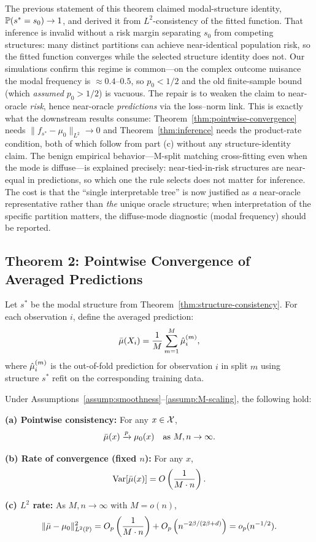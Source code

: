 \documentclass[12pt]{article}
\newcommand{\convp}{\xrightarrow{p}}
\begin{document}
\begin{remark}
The previous statement of this theorem claimed modal-structure identity, $\mathbb{P}(s^* = s_0)\to 1$, and derived it from $L^2$-consistency of the fitted function. That inference is invalid without a risk margin separating $s_0$ from competing structures: many distinct partitions can achieve near-identical population risk, so the fitted function converges while the selected structure identity does not. Our simulations confirm this regime is common---on the complex outcome nuisance the modal frequency is $\approx 0.4$--$0.5$, so $p_0 < 1/2$ and the old finite-sample bound (which \emph{assumed} $p_0 > 1/2$) is vacuous. The repair is to weaken the claim to near-oracle \emph{risk}, hence near-oracle \emph{predictions} via the loss--norm link. This is exactly what the downstream results consume: Theorem~\ref{thm:pointwise-convergence} needs $\|f_{s^*}-\mu_0\|_{L^2}\to 0$ and Theorem~\ref{thm:inference} needs the product-rate condition, both of which follow from part (c) without any structure-identity claim. The benign empirical behavior---M-split matching cross-fitting even when the mode is diffuse---is explained precisely: near-tied-in-risk structures are near-equal in predictions, so which one the rule selects does not matter for inference. The cost is that the ``single interpretable tree'' is now justified as \emph{a} near-oracle representative rather than \emph{the} unique oracle structure; when interpretation of the specific partition matters, the diffuse-mode diagnostic (modal frequency) should be reported.
\end{remark}

\subsection{Theorem 2: Pointwise Convergence of Averaged Predictions}

\begin{theorem}
\label{thm:pointwise-convergence}
Let $s^*$ be the modal structure from Theorem~\ref{thm:structure-consistency}. For each observation $i$, define the averaged prediction:
\[
\bar{\mu}(X_i) = \frac{1}{M} \sum_{m=1}^M \hat{\mu}_i^{(m)},
\]
where $\hat{\mu}_i^{(m)}$ is the out-of-fold prediction for observation $i$ in split $m$ using structure $s^*$ refit on the corresponding training data.

Under Assumptions~\ref{assump:smoothness}--\ref{assump:M-scaling}, the following hold:

\textbf{(a) Pointwise consistency:} For any $x \in \mathcal{X}$,
\[
\mubar(x) \convp \mu_0(x) \quad \text{as } M, n \to \infty.
\]

\textbf{(b) Rate of convergence (fixed $n$):} For any $x$,
\[
\operatorname{Var}[\bar{\mu}(x)] = O\left(\frac{1}{M \cdot n}\right).
\]

\textbf{(c) $L^2$ rate:} As $M, n \to \infty$ with $M = o(n)$,
\[
\|\bar{\mu} - \mu_0\|_{L^2(\mathbb{P})}^2 = O_p\left(\frac{1}{M \cdot n}\right) + O_p\left(n^{-2\beta/(2\beta+d)}\right) = o_p(n^{-1/2}).
\]
\end{theorem}
\end{document}
